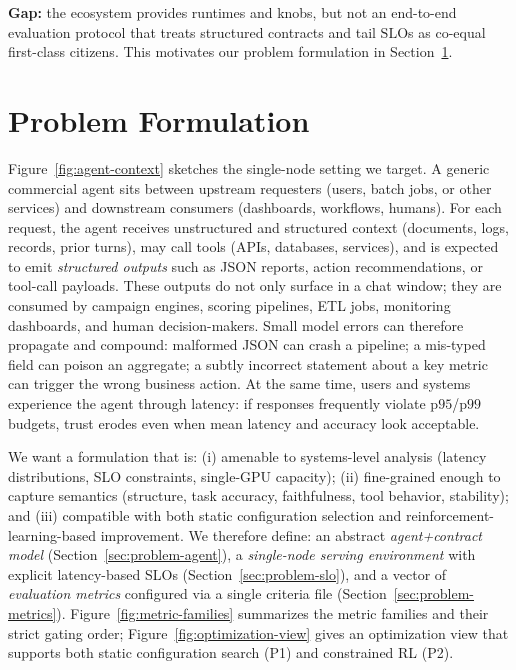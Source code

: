 \documentclass[11pt]{article}
\newcommand{\pninetyfive}{\ensuremath{\mathrm{p95}}}
\newcommand{\pninetynine}{\ensuremath{\mathrm{p99}}}
\newcommand{\slo}{\ensuremath{\mathrm{SLO}}}
\begin{document}
\textbf{Gap:} the ecosystem provides runtimes and knobs, but not an end-to-end evaluation protocol that treats structured contracts and tail \slo s as co-equal first-class citizens.
This motivates our problem formulation in Section~\ref{sec:problem}.

\section{Problem Formulation}
\label{sec:problem}

Figure~\ref{fig:agent-context} sketches the single-node setting we target.
A generic commercial agent sits between upstream requesters (users, batch jobs, or other services) and downstream consumers (dashboards, workflows, humans).
For each request, the agent receives unstructured and structured context (documents, logs, records, prior turns), may call tools (APIs, databases, services), and is expected to emit \emph{structured outputs} such as JSON reports, action recommendations, or tool-call payloads.
These outputs do not only surface in a chat window; they are consumed by campaign engines, scoring pipelines, ETL jobs, monitoring dashboards, and human decision-makers.
Small model errors can therefore propagate and compound:
malformed JSON can crash a pipeline;
a mis-typed field can poison an aggregate;
a subtly incorrect statement about a key metric can trigger the wrong business action.
At the same time, users and systems experience the agent through latency: if responses frequently violate \pninetyfive/\pninetynine budgets, trust erodes even when mean latency and accuracy look acceptable.

We want a formulation that is:
(i) amenable to systems-level analysis (latency distributions, SLO constraints, single-GPU capacity);
(ii) fine-grained enough to capture semantics (structure, task accuracy, faithfulness, tool behavior, stability);
and (iii) compatible with both static configuration selection and reinforcement-learning-based improvement.
We therefore define:
an abstract \emph{agent+contract model} (Section~\ref{sec:problem-agent}),
a \emph{single-node serving environment} with explicit latency-based SLOs (Section~\ref{sec:problem-slo}),
and a vector of \emph{evaluation metrics} configured via a single criteria file (Section~\ref{sec:problem-metrics}).
Figure~\ref{fig:metric-families} summarizes the metric families and their strict gating order; Figure~\ref{fig:optimization-view} gives an optimization view that supports both static configuration search (P1) and constrained RL (P2).
\end{document}
